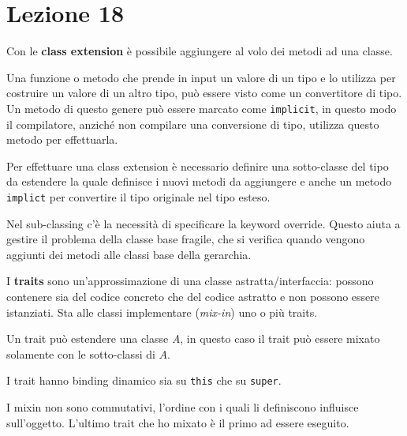 
\section{Lezione 18}

Con le \textbf{class extension} è possibile aggiungere al volo dei metodi ad una classe.

Una funzione o metodo che prende in input un valore di un tipo e lo utilizza per costruire un valore di un altro tipo, può essere visto come un convertitore di tipo. Un metodo di questo genere può essere marcato come \texttt{implicit}, in questo modo il compilatore, anziché non compilare una conversione di tipo, utilizza questo metodo per effettuarla.

Per effettuare una class extension è necessario definire una sotto-classe del tipo da estendere la quale definisce i nuovi metodi da aggiungere e anche un metodo \texttt{implict} per convertire il tipo originale nel tipo esteso.


Nel sub-classing c'è la necessità di specificare la keyword override. Questo aiuta a gestire il problema della classe base fragile, che si verifica quando vengono aggiunti dei metodi alle classi base della gerarchia.

I \textbf{traits} sono un'approssimazione di una classe astratta/interfaccia: possono contenere sia del codice concreto che del codice astratto e non possono essere istanziati.
Sta alle classi implementare (\textit{mix-in}) uno o più traits.

Un trait può estendere una classe \textit{A}, in questo caso il trait può essere mixato solamente con le sotto-classi di $A$.

I trait hanno binding dinamico sia su \texttt{this} che su \texttt{super}.

I mixin non sono commutativi, l'ordine con i quali li definiscono influisce sull'oggetto. L'ultimo trait che ho mixato è il primo ad essere eseguito.









